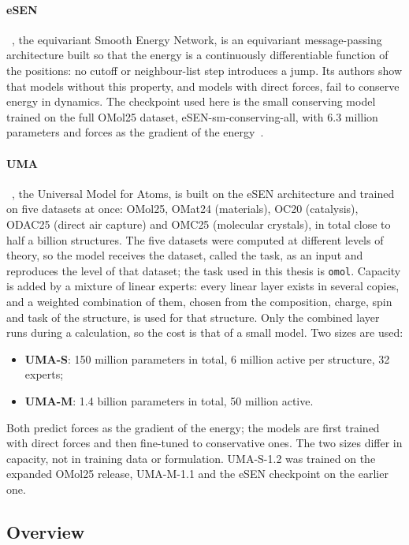 \paragraph{eSEN}~\cite{esen}, the equivariant Smooth Energy Network, is an
equivariant message-passing architecture built so that the energy is a
continuously differentiable function of the positions: no cutoff or
neighbour-list step introduces a jump. Its authors show that models
without this property, and models with direct forces, fail to conserve
energy in dynamics. The checkpoint used here is the small conserving
model trained on the full OMol25 dataset, eSEN-sm-conserving-all, with
6.3 million parameters and forces as the gradient of the
energy~\cite{omol25}.

\paragraph{UMA}~\cite{uma}, the Universal Model for Atoms, is built on
the eSEN architecture and trained on five datasets at once: OMol25,
OMat24 (materials), OC20 (catalysis), ODAC25 (direct air capture) and
OMC25 (molecular crystals), in total close to half a billion structures.
The five datasets were computed at different levels of theory, so the
model receives the dataset, called the task, as an input and reproduces
the level of that dataset; the task used in this thesis is \texttt{omol}.
Capacity is added by a mixture of linear experts: every linear layer
exists in several copies, and a weighted combination of them, chosen
from the composition, charge, spin and task of the structure, is used for
that structure. Only the combined layer runs during a calculation, so
the cost is that of a small model. Two sizes are used:

\begin{itemize}
  \item \textbf{UMA-S}: 150 million parameters in total, 6 million active
    per structure, 32 experts;
  \item \textbf{UMA-M}: 1.4 billion parameters in total, 50 million
    active.
\end{itemize}

Both predict forces as the gradient of the energy; the models are first
trained with direct forces and then fine-tuned to conservative ones. The
two sizes differ in capacity, not in training data or formulation.
UMA-S-1.2 was trained on the expanded OMol25 release, UMA-M-1.1 and the
eSEN checkpoint on the earlier one.

\subsection{Overview}
\label{sec:mlip-models}

